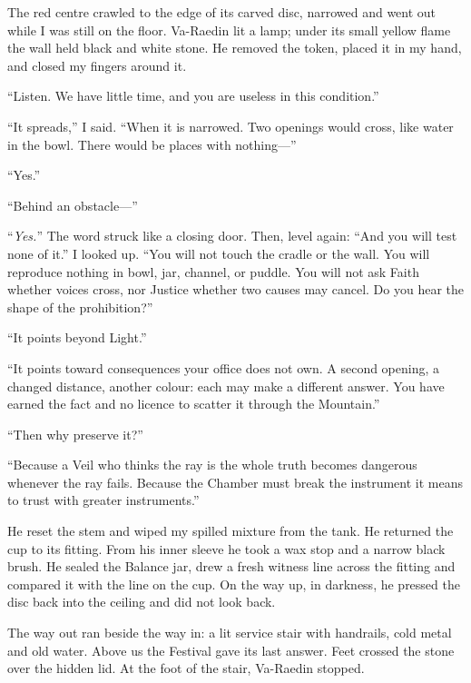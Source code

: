 The red centre crawled to the edge of its carved disc, narrowed and went out while I was still on the floor. Va-Raedin lit a lamp; under its small yellow flame the wall held black and white stone. He removed the token, placed it in my hand, and closed my fingers around it.\par

``Listen. We have little time, and you are useless in this condition.''\par
``It spreads,'' I said. ``When it is narrowed. Two openings would cross, like water in the bowl. There would be places with nothing---''\par
``Yes.''\par
``Behind an obstacle---''\par
``\textit{Yes.}'' The word struck like a closing door. Then, level again: ``And you will test none of it.'' I looked up. ``You will not touch the cradle or the wall. You will reproduce nothing in bowl, jar, channel, or puddle. You will not ask Faith whether voices cross, nor Justice whether two causes may cancel. Do you hear the shape of the prohibition?''\par

``It points beyond Light.''\par
``It points toward consequences your office does not own. A second opening, a changed distance, another colour: each may make a different answer. You have earned the fact and no licence to scatter it through the Mountain.''\par
``Then why preserve it?''\par
``Because a Veil who thinks the ray is the whole truth becomes dangerous whenever the ray fails. Because the Chamber must break the instrument it means to trust with greater instruments.''\par

He reset the stem and wiped my spilled mixture from the tank. He returned the cup to its fitting. From his inner sleeve he took a wax stop and a narrow black brush. He sealed the Balance jar, drew a fresh witness line across the fitting and compared it with the line on the cup. On the way up, in darkness, he pressed the disc back into the ceiling and did not look back.\par

\ornament

The way out ran beside the way in: a lit service stair with handrails, cold metal and old water. Above us the Festival gave its last answer. Feet crossed the stone over the hidden lid. At the foot of the stair, Va-Raedin stopped.\par

